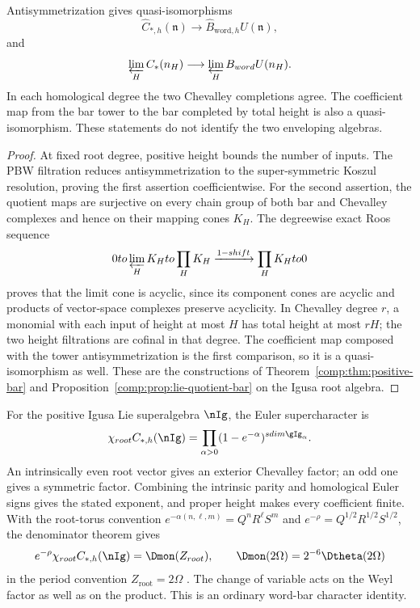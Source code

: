 \begin{theorem}
Antisymmetrization gives quasi-isomorphisms
\[
 \widehat C_{*,h}(\mathfrak n)
 \longrightarrow\widehat B_{\mathrm{word},h}U(\mathfrak n),
\]
and
\[
 \varprojlim_H C_*(\mathfrak n_H)
 \longrightarrow\varprojlim_H B_{\mathrm{word}}U(\mathfrak n_H).
\]
In each homological degree the two Chevalley completions agree.
The coefficient map from the bar tower to the bar completed by total height
is also a quasi-isomorphism. These statements do not identify the two
enveloping algebras.
\end{theorem}
\begin{proof}
At fixed root degree, positive height bounds the number of inputs.
The PBW filtration reduces antisymmetrization to the super-symmetric Koszul
resolution, proving the first assertion coefficientwise.
For the second assertion, the quotient maps are surjective on every chain group
of both bar and Chevalley complexes and hence on their mapping cones $K_H$.
The degreewise exact Roos sequence
\[
 0\to\varprojlim_HK_H\to\prod_HK_H
 \xrightarrow{1-\mathrm{shift}}\prod_HK_H\to0
\]
proves that the limit cone is acyclic, since its component cones are acyclic
and products of vector-space complexes preserve acyclicity.
In Chevalley degree $r$, a monomial with each input of height at most $H$ has
total height at most $rH$; the two height filtrations are cofinal in that degree.
The coefficient map composed with the tower antisymmetrization is the first
comparison, so it is a quasi-isomorphism as well.
These are the constructions of Theorem~\ref{comp:thm:positive-bar} and
Proposition~\ref{comp:prop:lie-quotient-bar} on the Igusa root algebra.
\end{proof}

For the positive Igusa Lie superalgebra $\nIg$, the Euler supercharacter is
\[
 \chi_{\mathrm{root}}\widehat C_{*,h}(\nIg)
 =\prod_{\alpha>0}(1-e^{-\alpha})^{\operatorname{sdim}\gIg_\alpha}.
\]
An intrinsically even root vector gives an exterior Chevalley factor; an odd
one gives a symmetric factor. Combining the intrinsic parity and homological
Euler signs gives the stated exponent, and proper height makes every coefficient finite.
With the root-torus convention $e^{-\alpha(n,\ell,m)}=Q^nR^\ell S^m$ and
$e^{-\rho}=Q^{1/2}R^{1/2}S^{1/2}$, the denominator theorem gives
\[
 e^{-\rho}\chi_{\mathrm{root}}\widehat C_{*,h}(\nIg)
 =\Dmon(Z_{\mathrm{root}}),\qquad
 \Dmon(2\Omega)=2^{-6}\Dtheta(2\Omega)
\]
in the period convention $Z_{\mathrm{root}}=2\Omega$ \cite{GN97,GN98b}.
The change of variable acts on the Weyl factor as well as on the product.
This is an ordinary word-bar character identity.


